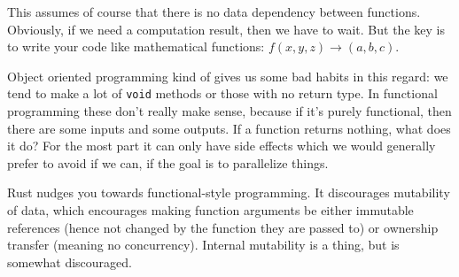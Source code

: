 This assumes of course that there is no data dependency between functions. Obviously, if we need a computation result, then we have to wait. But the key is to write your code like mathematical functions: $f(x, y, z) \rightarrow (a, b, c)$.

Object oriented programming kind of gives us some bad habits in this regard: we tend to make a lot of \texttt{void} methods or those with no return type. In functional programming these don't really make sense, because if it's purely functional, then there are some inputs and some outputs. If a function returns nothing, what does it do? For the most part it can only have side effects which we would generally prefer to avoid if we can, if the goal is to parallelize things.

Rust nudges you towards functional-style programming. It discourages mutability of data, which encourages making function arguments be either immutable references (hence not changed by the function they are passed to) or ownership transfer (meaning no concurrency). Internal mutability is a thing, but is somewhat discouraged.
\\ \vspace*{-3em}




